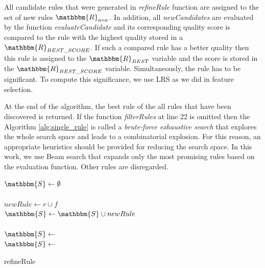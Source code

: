 \documentclass{bmcart}
\begin{document}
All candidate rules that were generated in \emph{refineRule} function are assigned to the set of new rules $\mathbbm{R}_{new}$. In addition, all \textit{newCandidates} are evaluated by the function \textit{evaluateCandidate} and its corresponding quality score is compared to the rule with the highest quality stored in a $\mathbbm{R}_{BEST\_SCORE}$. If such a compared rule has a better quality then this rule is assigned to the $\mathbbm{R}_{BEST}$ variable and the score is stored in the $\mathbbm{R}_{BEST\_SCORE}$ variable. Simultaneously, the rule has to be significant. To compute this significance, we use LRS as we did in feature selection.

At the end of the algorithm, the best rule of the all rules that have been discovered is returned. If the function \textit{filterRules} at line 22 is omitted then the Algorithm \ref{alg:single_rule} is called a \emph{brute-force exhaustive search} that explores the whole search space and leads to a combinatorial explosion. For this reason, an appropriate heuristics should be provided for reducing the search space. In this work, we use Beam search that expands only the most promising rules based on the evaluation function. Other rules are disregarded.


\begin{algorithm}[!t]
\BlankLine
$\mathbbm{S} \leftarrow \emptyset$\\
\\
{
    $newRule \leftarrow r \cup f$\\
	$\mathbbm{S} \leftarrow \mathbbm{S} \cup newRule$\\
}
\\
$\mathbbm{S} \leftarrow $\\
$\mathbbm{S} \leftarrow $\\
\caption{refineRule}\label{algo_newrefinement}
\end{algorithm}
\end{document}
